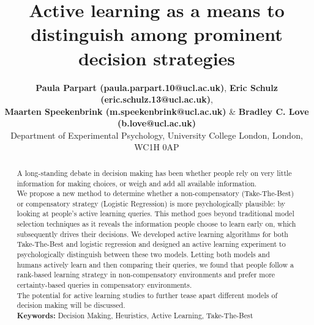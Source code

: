 \documentclass[10pt,letterpaper]{article}
\title{Active learning as a means to distinguish among prominent decision strategies}
\author{{\large \bf Paula Parpart (paula.parpart.10@ucl.ac.uk)}, {\large \bf Eric Schulz (eric.schulz.13@ucl.ac.uk)}, \\{\large \bf Maarten Speekenbrink (m.speekenbrink@ucl.ac.uk)} \& {\large \bf Bradley C. Love (b.love@ucl.ac.uk)}\medskip\\
Department of Experimental Psychology, University College London, London, WC1H 0AP}
\begin{document}
\maketitle

\begin{abstract}
A long-standing debate in decision making has been whether people rely on very little information for making choices, or weigh and add all available information.\\
We propose a new method to determine whether a non-compensatory (Take-The-Best) or compensatory strategy (Logistic Regression) is more psychologically plausible: by looking at people’s active learning queries. This method goes beyond traditional model selection techniques as it reveals the information people choose to learn early on, which subsequently drives their decisions.  We developed active learning algorithms for both Take-The-Best and logistic regression and designed an active learning experiment to psychologically distinguish between these two models. Letting both models and humans actively learn and then comparing their queries, we found that people follow a rank-based learning strategy in non-compensatory environments and prefer more certainty-based queries in compensatory environments.\\
The potential for active learning studies to further tease apart different models of decision making will be discussed.
\medskip\\
\textbf{Keywords:} 
Decision Making, Heuristics, Active Learning, Take-The-Best
\end{abstract}
\end{document}
